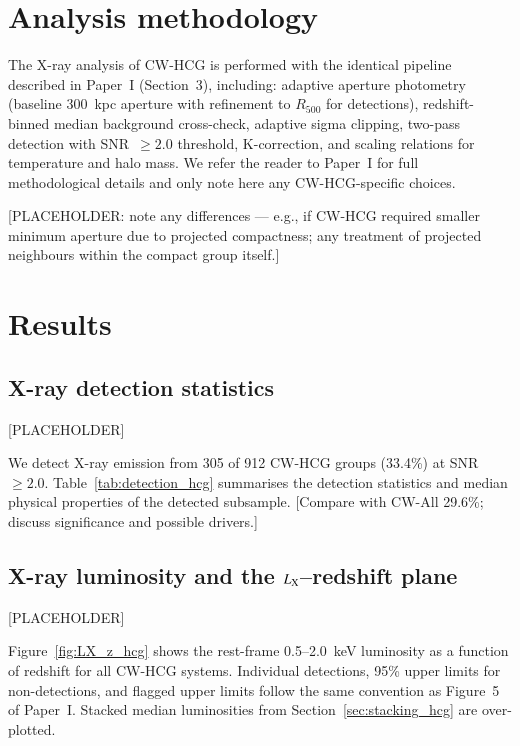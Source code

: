 \documentclass{aa}
\begin{document}
\section{Analysis methodology}
\label{sec:analysis}

The X-ray analysis of CW-HCG is performed with the identical pipeline described in Paper~I (Section~3), including: adaptive aperture photometry (baseline 300~kpc aperture with refinement to $R_{500}$ for detections), redshift-binned median background cross-check, adaptive sigma clipping, two-pass detection with SNR~$\geq 2.0$ threshold, K-correction, and scaling relations for temperature and halo mass. We refer the reader to Paper~I for full methodological details and only note here any CW-HCG-specific choices.

[PLACEHOLDER: note any differences --- e.g., if CW-HCG required smaller minimum aperture due to projected compactness; any treatment of projected neighbours within the compact group itself.]

\section{Results}
\label{sec:results}

\subsection{X-ray detection statistics}

[PLACEHOLDER]

We detect X-ray emission from 305 of 912 CW-HCG groups (33.4\%) at SNR~$\geq 2.0$. Table~\ref{tab:detection_hcg} summarises the detection statistics and median physical properties of the detected subsample. [Compare with CW-All 29.6\%; discuss significance and possible drivers.]

\subsection{X-ray luminosity and the $L_{\rm X}$--redshift plane}

[PLACEHOLDER]

Figure~\ref{fig:LX_z_hcg} shows the rest-frame 0.5--2.0~keV luminosity as a function of redshift for all CW-HCG systems. Individual detections, 95\% upper limits for non-detections, and flagged upper limits follow the same convention as Figure~5 of Paper~I. Stacked median luminosities from Section~\ref{sec:stacking_hcg} are over-plotted.
\end{document}
